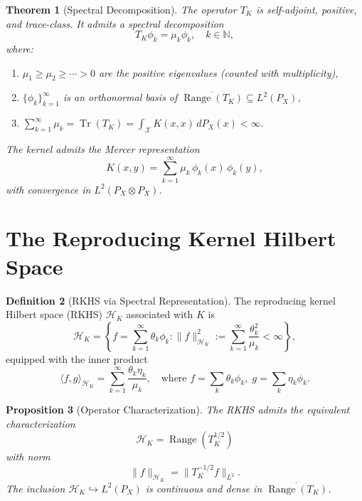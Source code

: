 \documentclass[11pt]{article}
\newtheorem{theorem}{Theorem}[section]
\newtheorem{proposition}[theorem]{Proposition}
\theoremstyle{definition}
\newtheorem{definition}[theorem]{Definition}
\DeclareMathOperator{\Range}{Range}
\DeclareMathOperator{\Tr}{Tr}
\newcommand{\HK}{\mathcal{H}_K}
\newcommand{\X}{\mathcal{X}}
\newcommand{\N}{\mathbb{N}}
\newcommand{\inprod}[2]{\langle #1, #2 \rangle}
\newcommand{\norm}[1]{\| #1 \|}
\begin{document}
\begin{theorem}[Spectral Decomposition]
\label{thm:spectral}
The operator $T_K$ is self-adjoint, positive, and trace-class. It admits a spectral decomposition
\begin{equation}
    T_K \phi_k = \mu_k \phi_k, \quad k \in \N,
\end{equation}
where:
\begin{enumerate}[label=(\roman*)]
    \item $\mu_1 \geq \mu_2 \geq \cdots > 0$ are the positive eigenvalues (counted with multiplicity),
    \item $\{\phi_k\}_{k=1}^\infty$ is an orthonormal basis of $\overline{\Range(T_K)} \subseteq L^2(P_X)$,
    \item $\sum_{k=1}^\infty \mu_k = \Tr(T_K) = \int_{\X} K(x,x) \, dP_X(x) < \infty$.
\end{enumerate}
The kernel admits the Mercer representation
\begin{equation}
    K(x, y) = \sum_{k=1}^\infty \mu_k \, \phi_k(x) \, \phi_k(y),
\end{equation}
with convergence in $L^2(P_X \otimes P_X)$.
\end{theorem}

\section{The Reproducing Kernel Hilbert Space}

\begin{definition}[RKHS via Spectral Representation]
\label{def:rkhs}
The reproducing kernel Hilbert space (RKHS) $\HK$ associated with $K$ is
\begin{equation}
    \HK = \left\{ f = \sum_{k=1}^\infty \theta_k \phi_k : \norm{f}_{\HK}^2 := \sum_{k=1}^\infty \frac{\theta_k^2}{\mu_k} < \infty \right\},
\end{equation}
equipped with the inner product
\begin{equation}
    \inprod{f}{g}_{\HK} = \sum_{k=1}^\infty \frac{\theta_k \eta_k}{\mu_k}, \quad \text{where } f = \sum_k \theta_k \phi_k, \; g = \sum_k \eta_k \phi_k.
\end{equation}
\end{definition}

\begin{proposition}[Operator Characterization]
\label{prop:rkhs-operator}
The RKHS admits the equivalent characterization
\begin{equation}
    \HK = \Range(T_K^{1/2})
\end{equation}
with norm
\begin{equation}
    \norm{f}_{\HK} = \norm{T_K^{-1/2} f}_{L^2}.
\end{equation}
The inclusion $\HK \hookrightarrow L^2(P_X)$ is continuous and dense in $\overline{\Range(T_K)}$.
\end{proposition}
\end{document}
